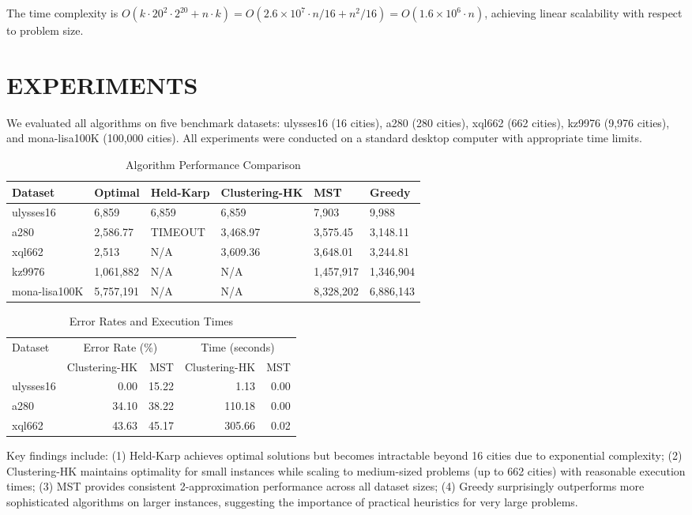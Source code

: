 \documentclass[sigconf]{acmart}
\begin{document}
The time complexity is $O(k \cdot 20^2 \cdot 2^{20} + n \cdot k) = O(2.6 \times 10^7 \cdot n/16 + n^2/16) = O(1.6 \times 10^6 \cdot n)$, achieving linear scalability with respect to problem size.

\section{EXPERIMENTS}

We evaluated all algorithms on five benchmark datasets: ulysses16 (16 cities), a280 (280 cities), xql662 (662 cities), kz9976 (9,976 cities), and mona-lisa100K (100,000 cities). All experiments were conducted on a standard desktop computer with appropriate time limits.

\begin{table}[h]
\centering
\caption{Algorithm Performance Comparison}
\scriptsize
\begin{tabular}{p{2cm}p{1.5cm}p{1.5cm}p{1.5cm}p{1.5cm}p{1.5cm}}
\toprule
Dataset & Optimal & Held-Karp & Clustering-HK & MST & Greedy \\
\midrule
ulysses16 & 6,859 & 6,859 & 6,859 & 7,903 & 9,988 \\
a280 & 2,586.77 & TIMEOUT & 3,468.97 & 3,575.45 & 3,148.11 \\
xql662 & 2,513 & N/A & 3,609.36 & 3,648.01 & 3,244.81 \\
kz9976 & 1,061,882 & N/A & N/A & 1,457,917 & 1,346,904 \\
mona-lisa100K & 5,757,191 & N/A & N/A & 8,328,202 & 6,886,143 \\
\bottomrule
\end{tabular}
\end{table}

\begin{table}[h]
\centering
\caption{Error Rates and Execution Times}
\begin{tabular}{lrrrr}
\toprule
Dataset & \multicolumn{2}{c}{Error Rate (\%)} & \multicolumn{2}{c}{Time (seconds)} \\
& Clustering-HK & MST & Clustering-HK & MST \\
\midrule
ulysses16 & 0.00 & 15.22 & 1.13 & 0.00 \\
a280 & 34.10 & 38.22 & 110.18 & 0.00 \\
xql662 & 43.63 & 45.17 & 305.66 & 0.02 \\
\bottomrule
\end{tabular}
\end{table}

Key findings include: (1) Held-Karp achieves optimal solutions but becomes intractable beyond 16 cities due to exponential complexity; (2) Clustering-HK maintains optimality for small instances while scaling to medium-sized problems (up to 662 cities) with reasonable execution times; (3) MST provides consistent 2-approximation performance across all dataset sizes; (4) Greedy surprisingly outperforms more sophisticated algorithms on larger instances, suggesting the importance of practical heuristics for very large problems.
\end{document}
